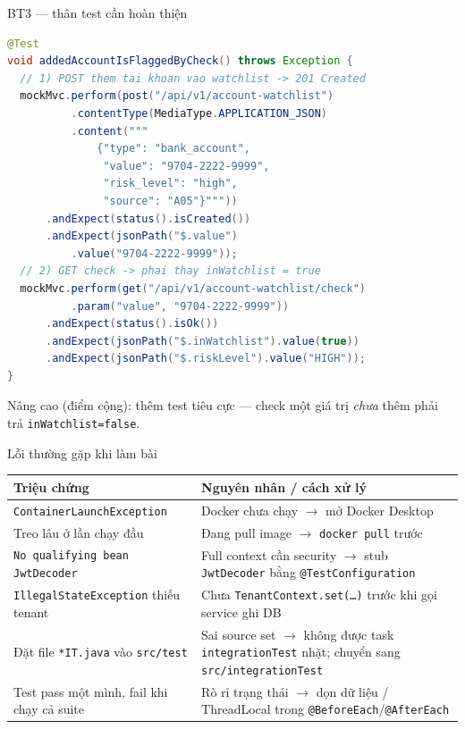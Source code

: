 \documentclass[aspectratio=169,12pt]{beamer}
\begin{document}
\begin{frame}[fragile]{BT3 --- thân test cần hoàn thiện}
  \vspace*{-0.7em}
\begin{lstlisting}[language=Java,style=codesm,basicstyle=\ttfamily\scriptsize]
@Test
void addedAccountIsFlaggedByCheck() throws Exception {
  // 1) POST them tai khoan vao watchlist -> 201 Created
  mockMvc.perform(post("/api/v1/account-watchlist")
          .contentType(MediaType.APPLICATION_JSON)
          .content("""
              {"type": "bank_account",
               "value": "9704-2222-9999",
               "risk_level": "high",
               "source": "A05"}"""))
      .andExpect(status().isCreated())
      .andExpect(jsonPath("$.value")
          .value("9704-2222-9999"));
  // 2) GET check -> phai thay inWatchlist = true
  mockMvc.perform(get("/api/v1/account-watchlist/check")
          .param("value", "9704-2222-9999"))
      .andExpect(status().isOk())
      .andExpect(jsonPath("$.inWatchlist").value(true))
      .andExpect(jsonPath("$.riskLevel").value("HIGH"));
}
\end{lstlisting}
  {\scriptsize Nâng cao (điểm cộng): thêm test tiêu cực --- check một giá trị
  \emph{chưa} thêm phải trả \texttt{inWatchlist=false}.}
\end{frame}

\begin{frame}{Lỗi thường gặp khi làm bài}
  \begin{center}
  \footnotesize
  \setlength{\tabcolsep}{4pt}
  \begin{tabular}{>{\raggedright\arraybackslash}p{5.4cm}>{\raggedright\arraybackslash}p{6.4cm}}
    \toprule
    \textbf{Triệu chứng} & \textbf{Nguyên nhân / cách xử lý} \\
    \midrule
    \texttt{ContainerLaunchException} &
    Docker chưa chạy $\to$ mở Docker Desktop \\
    Treo lâu ở lần chạy đầu &
    Đang pull image $\to$ \texttt{docker pull} trước \\
    \texttt{No qualifying bean JwtDecoder} &
    Full context cần security $\to$ stub \texttt{JwtDecoder} bằng
    \texttt{@TestConfiguration} \\
    \texttt{IllegalStateException} thiếu tenant &
    Chưa \texttt{TenantContext.set(\ldots)} trước khi gọi service ghi DB \\
    Đặt file \texttt{*IT.java} vào \texttt{src/test} &
    Sai source set $\to$ không được task \texttt{integrationTest} nhặt;
    chuyển sang \texttt{src/integrationTest} \\
    Test pass một mình, fail khi chạy cả suite &
    Rò rỉ trạng thái $\to$ dọn dữ liệu / ThreadLocal trong
    \texttt{@BeforeEach}/\texttt{@AfterEach} \\
    \bottomrule
  \end{tabular}
  \end{center}
\end{frame}
\end{document}
